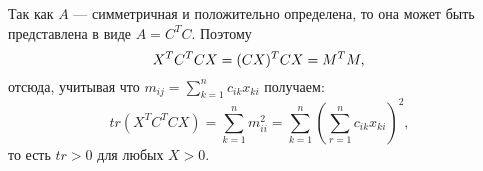 \documentclass{article}
\begin{document}
Так как $A$ --- симметричная и положительно определена, то она может быть представлена в виде $A=C^TC$. Поэтому
$$
X^TC^TCX=(CX)^TCX=M^TM,\\
$$
отсюда, учитывая что $m_{ij}=\sum\limits_{k=1}^{n}c_{ik}x_{ki}$ получаем:
$$
tr(X^TC^TCX)=\sum\limits_{k=1}^{n}m_{ii}^2=\sum\limits_{k=1}^{n}(\sum\limits_{r=1}^{n}c_{ik}x_{ki})^2,
$$
то есть $tr>0$ для любых $X>0$.
\end{document}
